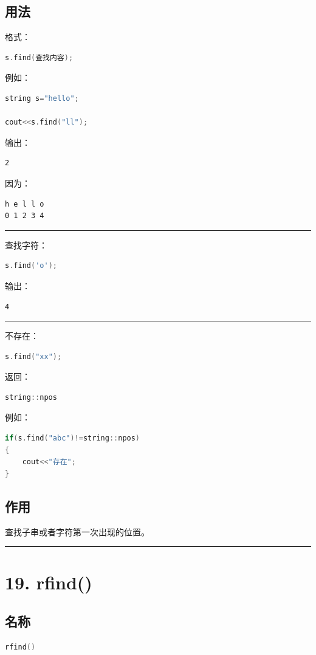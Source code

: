 \documentclass[9pt,twocolumn]{extarticle}
\begin{document}
\subsection{用法}
格式：
\begin{lstlisting}[language=C++]
s.find(查找内容);
\end{lstlisting}
例如：
\begin{lstlisting}[language=C++]
string s="hello";

cout<<s.find("ll");
\end{lstlisting}
输出：
\begin{lstlisting}
2
\end{lstlisting}
因为：
\begin{lstlisting}
h e l l o
0 1 2 3 4
\end{lstlisting}

\noindent\rule{\linewidth}{0.4pt}

查找字符：
\begin{lstlisting}[language=C++]
s.find('o');
\end{lstlisting}
输出：
\begin{lstlisting}
4
\end{lstlisting}

\noindent\rule{\linewidth}{0.4pt}

不存在：
\begin{lstlisting}[language=C++]
s.find("xx");
\end{lstlisting}
返回：
\begin{lstlisting}[language=C++]
string::npos
\end{lstlisting}
例如：
\begin{lstlisting}[language=C++]
if(s.find("abc")!=string::npos)
{
    cout<<"存在";
}
\end{lstlisting}

\subsection{作用}
查找子串或者字符第一次出现的位置。

\noindent\rule{\linewidth}{0.4pt}

\section{19. rfind()}

\subsection{名称}
\begin{lstlisting}[language=C++]
rfind()
\end{lstlisting}
\end{document}
